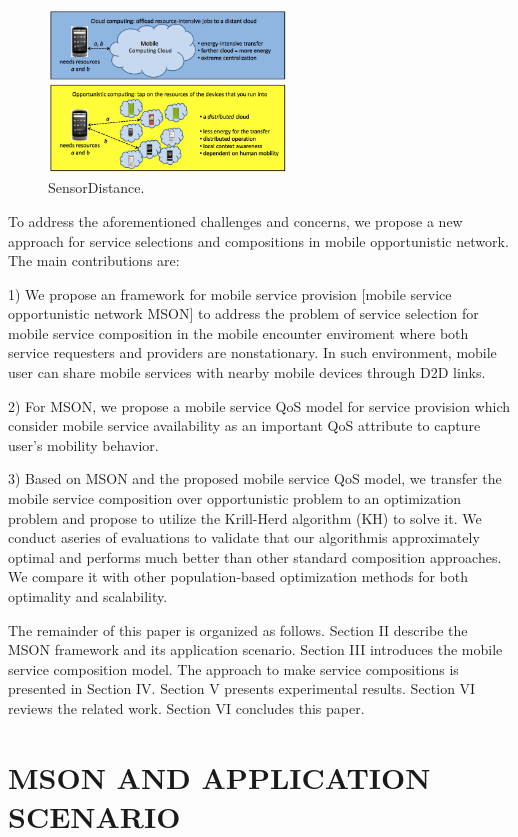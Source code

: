 \documentclass[10pt,journal,compsoc]{IEEEtran}
\begin{document}
\begin{figure}[!t]
\centering
\includegraphics[width=2.5in]{./img/fig1.png}
\caption{SensorDistance.}
\label{fig_sim}
\end{figure}

To address the aforementioned challenges and concerns, we propose a new approach for service selections and compositions in mobile opportunistic network. The main contributions are:

1) We propose an framework for mobile service provision [mobile service opportunistic network MSON] to address the problem of service selection for mobile service composition in the mobile encounter enviroment where both service requesters and providers are nonstationary. In such environment, mobile user can share mobile services with nearby mobile devices through D2D links.

2) For MSON, we propose a mobile service QoS model for service provision which consider mobile service availability as an important QoS attribute to capture user's mobility behavior.

3) Based on MSON and the proposed mobile service QoS model, we transfer the mobile service composition over opportunistic problem to an optimization problem and propose to utilize the Krill-Herd algorithm (KH) to solve it. We conduct aseries of evaluations to validate that our algorithmis approximately optimal and performs much better than other standard composition approaches. We compare it with other population-based optimization methods for both optimality and scalability. 

The remainder of this paper is organized as follows. Section II describe the MSON framework and its application scenario. Section III introduces the mobile service composition model. The approach to make service compositions is presented in Section IV. Section V presents experimental results. Section VI reviews the related work. Section VI concludes this paper.

\section{MSON AND APPLICATION SCENARIO}
\end{document}
